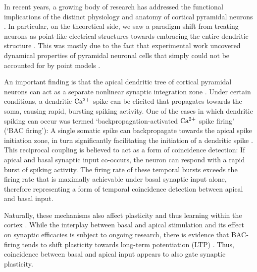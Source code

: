 \documentclass[utf8]{frontiersSCNS} %
\begin{document}
In recent years, a growing body of research has addressed the 
functional implications of the distinct physiology and anatomy of 
cortical pyramidal neurons \citep{Spruston2008,Hay2011,Ramaswamy2015}. 
In particular, on the theoretical side,
we saw a paradigm shift from treating neurons as point-like electrical
structures towards embracing the entire dendritic structure 
\citep{Larkum2009,Poirazi2009,Shai2015}. This was 
mostly due to the fact that experimental work 
uncovered dynamical properties of pyramidal neuronal
cells that simply could not be accounted for by point models
\citep{Spruston1995,Hausser2000}.

An important finding is that the apical dendritic tree of
cortical pyramidal neurons can act as a separate nonlinear synaptic 
integration zone \citep{Spruston2008,Branco2011}. 
Under certain conditions, a dendritic $\rm Ca^{2+}$ spike
can be elicited that propagates towards the soma, causing rapid, bursting
spiking activity. One of the cases in which dendritic spiking can occur
was termed `backpropagation-activated $\rm Ca^{2+}$ spike firing' 
(`BAC firing'): A single somatic spike can backpropagate towards the apical
spike initiation zone, in turn significantly facilitating the initiation of 
a dendritic spike \citep{Stuart2001,Spruston2008,Larkum2013}. 
This reciprocal coupling is believed to act as a form of
coincidence detection: If apical and basal synaptic input co-occurs, the 
neuron can respond with a rapid burst of spiking activity. 
The firing rate of these temporal bursts exceeds the firing 
rate that is maximally achievable under basal synaptic input alone, 
therefore representing a form of temporal coincidence
detection between apical and basal input.

Naturally, these mechanisms also affect plasticity and thus learning
within the cortex \citep{Sjoestroem2006,Ebner2019}. 
While the interplay between basal and apical stimulation and
its effect on synaptic efficacies is subject to ongoing research, 
there is evidence that BAC-firing tends to shift plasticity 
towards long-term potentiation (LTP) \citep{Letzkus2006}. 
Thus, coincidence between basal and apical input appears 
to also gate synaptic plasticity.
\end{document}
